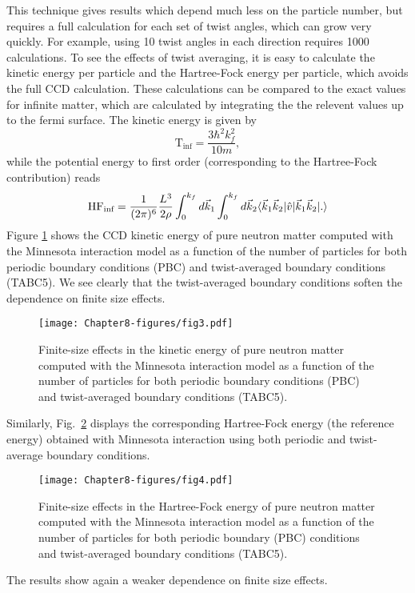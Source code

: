 \documentclass[thesis.tex]{subfiles}
\begin{document}
  This technique gives results which depend much less on the particle
  number, but requires a full calculation for each set of twist
  angles, which can grow very quickly. For example, using 10 twist
  angles in each direction requires 1000 calculations. To see the
  effects of twist averaging, it is easy to calculate the kinetic
  energy per particle and the Hartree-Fock energy per particle, which
  avoids the full CCD calculation. These calculations can be compared
  to the exact values for infinite matter, which are calculated by
  integrating the the relevent values up to the fermi surface. The kinetic energy is given by
  \[
\text{T}_{\text{inf}}=\frac{3\hbar^{2}k_{f}^{2}}{10m},
\]
while the potential energy to first order (corresponding to the Hartree-Fock contribution) reads
\[
\text{HF}_{\text{inf}}=\frac{1}{\mathop{(2\pi)^{6}}}\frac{L^{3}}{2\rho}\int_{0}^{k_{f}}d\vec{k}_{1}\int_{0}^{k_{f}}d\vec{k}_{2}\langle \vec{k}_{1}\vec{k}_{2}|\hat{v}|\vec{k}_{1}\vec{k}_{2} | .\rangle
\]
Figure \ref{fig:fig3} shows the CCD kinetic energy of pure neutron
      matter computed with the Minnesota interaction model  \cite{minnesota} as a function of
      the number of particles for both periodic boundary conditions (PBC)
      and twist-averaged boundary conditions (TABC5). We see clearly that the 
twist-averaged boundary conditions soften the dependence on finite size effects. 
  \begin{figure}
    \texttt{[image: Chapter8-figures/fig3.pdf]}
    \caption{Finite-size effects in the kinetic energy of pure neutron
      matter computed with the Minnesota interaction model  \cite{minnesota} as a function of
      the number of particles for both periodic boundary conditions (PBC)
      and twist-averaged boundary conditions (TABC5).}
    \label{fig:fig3}
  \end{figure}
Similarly, Fig.~\ref{fig:fig4} displays the corresponding Hartree-Fock energy (the reference energy) 
obtained with Minnesota interaction using both periodic and twist-average boundary conditions.  
  \begin{figure}
    \texttt{[image: Chapter8-figures/fig4.pdf]}
    \caption{Finite-size effects in the Hartree-Fock energy of pure
      neutron matter computed with the Minnesota interaction model  \cite{minnesota} as a
      function of the number of particles for both periodic boundary (PBC)
      conditions and twist-averaged boundary conditions (TABC5).}
    \label{fig:fig4}
  \end{figure}
The results show again a weaker dependence on finite size effects.
\end{document}
